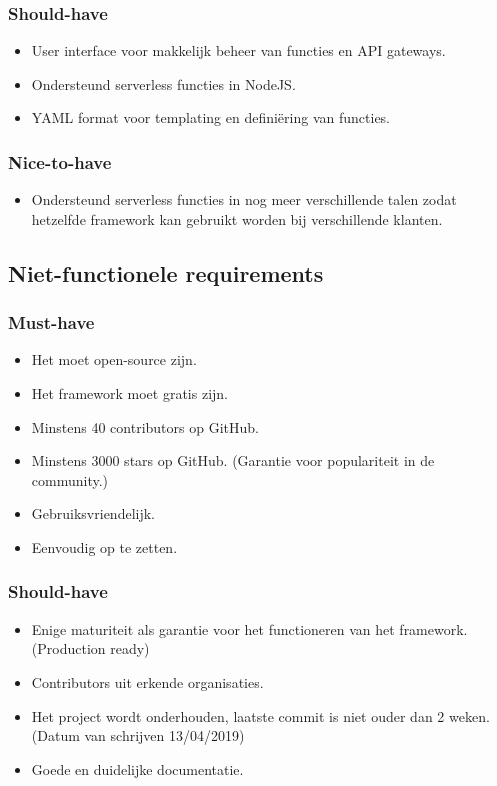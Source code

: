 \subsubsection{Should-have}
\begin{itemize}
    \item User interface voor makkelijk beheer van functies en API gateways.
    \item Ondersteund serverless functies in NodeJS.
    \item YAML format voor templating en definiëring van functies.
\end{itemize}
\subsubsection{Nice-to-have}
\begin{itemize}
    \item Ondersteund serverless functies in nog meer verschillende talen zodat hetzelfde framework kan gebruikt worden bij verschillende klanten.
\end{itemize}
\subsection{Niet-functionele requirements}
\subsubsection{Must-have}
\begin{itemize}
    \item Het moet open-source zijn.
    \item Het framework moet gratis zijn.
    \item Minstens 40 contributors op GitHub.
    \item Minstens 3000 stars op GitHub. (Garantie voor populariteit in de community.)
    \item Gebruiksvriendelijk.
    \item Eenvoudig op te zetten.
\end{itemize}
\subsubsection{Should-have}
\begin{itemize}
    \item Enige maturiteit als garantie voor het functioneren van het framework. (Production ready)
    \item Contributors uit erkende organisaties.
    \item Het project wordt onderhouden, laatste commit is niet ouder dan 2 weken. (Datum van schrijven 13/04/2019)
    \item Goede en duidelijke documentatie.
\end{itemize}
